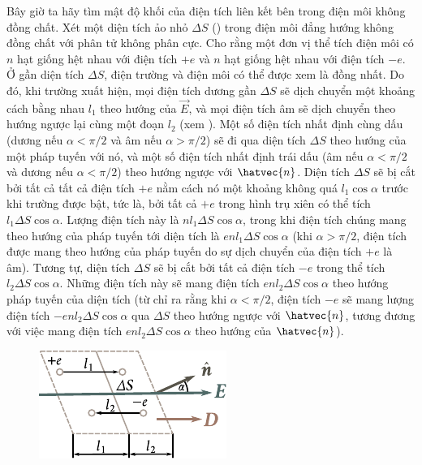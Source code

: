 Bây giờ ta hãy tìm mật độ khối của điện tích liên kết bên trong điện môi không đồng chất. Xét một diện tích ảo nhỏ $\Delta{S}$ () trong điện môi đẳng hướng không đồng chất với phân tử không phân cực.
Cho rằng một đơn vị thể tích điện môi có $n$ hạt giống hệt nhau với điện tích $+e$ và $n$ hạt giống hệt nhau với điện tích $-e$. Ở gần diện tích $\Delta{S}$, điện trường và điện môi có thể được xem là đồng nhất.
Do đó, khi trường xuất hiện, mọi điện tích dương gần $\Delta{S}$ sẽ dịch chuyển một khoảng cách bằng nhau $l_1$ theo hướng của $\vec{E}$, và mọi điện tích âm sẽ dịch chuyển theo hướng ngược lại cùng một đoạn $l_2$ (xem ).
Một số điện tích nhất định cùng dấu (dương nếu $\alpha<\pi/2$ và âm nếu $\alpha>\pi/2$) sẽ đi qua diện tích $\Delta{S}$ theo hướng của một pháp tuyến với nó, và một số điện tích nhất định trái dấu (âm nếu $\alpha<\pi/2$ và dương nếu $\alpha<\pi/2$) theo hướng ngược với $\hatvec{n}$.
Diện tích $\Delta{S}$ sẽ bị cắt bởi tất cả tất cả điện tích $+e$ nằm cách nó một khoảng không quá $l_1\cos\alpha$ trước khi trường được bật, tức là, bởi tất cả $+e$ trong hình trụ xiên có thể tích $l_1\Delta{S}\cos\alpha$. Lượng điện tích này là $nl_1\Delta{S}\cos\alpha$, trong khi điện tích chúng mang theo hướng của pháp tuyến tới diện tích là $enl_1\Delta{S}\cos\alpha$ (khi $\alpha>\pi/2$, điện tích được mang theo hướng của pháp tuyến do sự dịch chuyển của điện tích $+e$ là âm).
Tương tự, diện tích $\Delta{S}$ sẽ bị cắt bởi tất cả điện tích $-e$ trong thể tích $l_2\Delta{S}\cos\alpha$. Những điện tích này sẽ mang điện tích $enl_2\Delta{S}\cos\alpha$ theo hướng pháp tuyến của diện tích (từ  chỉ ra rằng khi $\alpha<\pi/2$, điện tích $-e$ sẽ mang lượng điện tích $-enl_2\Delta{S}\cos\alpha$ qua $\Delta{S}$ theo hướng ngược với $\hatvec{n}$, tương đương với việc mang điện tích $enl_2\Delta{S}\cos\alpha$ theo hướng của $\hatvec{n}$).

\begin{figure}[!htb]
	\begin{center}
		\includegraphics[scale=1.1]{figures/ch_02/fig_2_3.pdf}
		\caption[]{}
		\label{fig:2_3}
	\end{center}
	\vspace{-0.8cm}
\end{figure}

